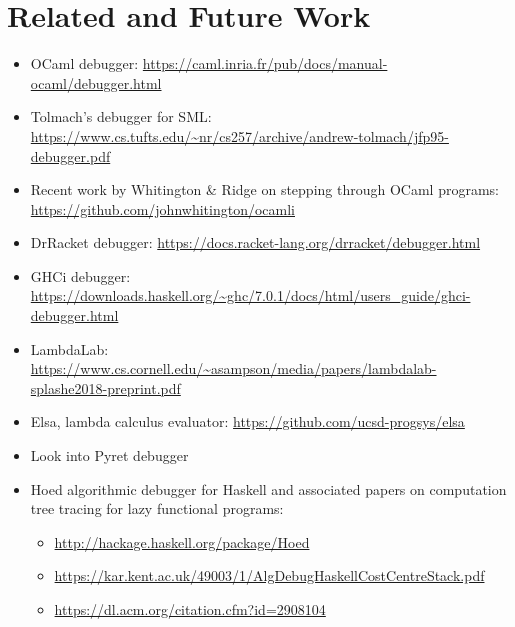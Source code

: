 \newcommand{\relatedWorkSection}{Related and Future Work}
\section{\relatedWorkSection} %
\label{sec:relatedWork}

\begin{itemize}
\item OCaml debugger: \url{https://caml.inria.fr/pub/docs/manual-ocaml/debugger.html}
\item Tolmach's debugger for SML: \url{https://www.cs.tufts.edu/~nr/cs257/archive/andrew-tolmach/jfp95-debugger.pdf}
\item Recent work by Whitington \& Ridge on stepping through OCaml programs: \url{https://github.com/johnwhitington/ocamli}
\item DrRacket debugger: \url{https://docs.racket-lang.org/drracket/debugger.html}
\item GHCi debugger: \url{https://downloads.haskell.org/~ghc/7.0.1/docs/html/users_guide/ghci-debugger.html}
\item LambdaLab: \url{https://www.cs.cornell.edu/~asampson/media/papers/lambdalab-splashe2018-preprint.pdf}
\item Elsa, lambda calculus evaluator: \url{https://github.com/ucsd-progsys/elsa}
\item Look into Pyret debugger
\item Hoed algorithmic debugger for Haskell and associated papers on computation tree tracing for lazy functional programs: 
	\begin{itemize}
	\item \url{http://hackage.haskell.org/package/Hoed}
	\item \url{https://kar.kent.ac.uk/49003/1/AlgDebugHaskellCostCentreStack.pdf}
	\item \url{https://dl.acm.org/citation.cfm?id=2908104}
	\end{itemize}
\end{itemize}

